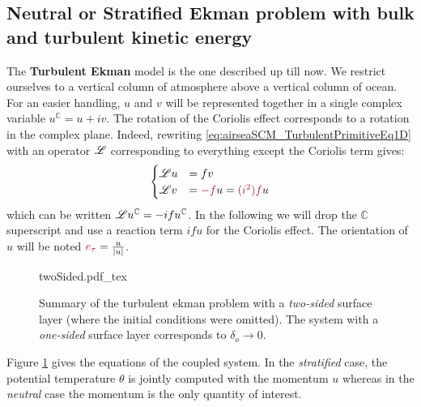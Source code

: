 \subsection{Neutral or Stratified Ekman problem with bulk and turbulent kinetic energy}
\label{sec:airseaSCM_hierarchy_TurbulentEkman}
The \textbf{Turbulent Ekman} model is the one described up till now.
We restrict ourselves to a vertical column of atmosphere
above a vertical column of ocean.
For an easier handling, $u$ and $v$ will be represented together in
a single complex variable $u^{\mathbb{C}} = u+iv$.
The rotation of the Coriolis effect corresponds to
a rotation in the complex plane.
Indeed, rewriting \eqref{eq:airseaSCM_TurbulentPrimitiveEq1D}
with an operator ${\cal L}$ corresponding to everything except
the Coriolis term gives:
\begin{equation}
	\label{eq:airseaSCM_complexForm}
\begin{cases}
	{\cal L}u &= fv\\
	{\cal L}v &= \emphase{- f}u = \emphase{(i^2) f} u
\end{cases}
\end{equation}
which can be written ${\cal L}u^{\mathbb{C}} = -i f u^\mathbb{C}$.
In the following we will drop the ${\mathbb{C}}$ superscript
and use a reaction term $ifu$ for the Coriolis effect. The
orientation of $u$ will be noted $\emphase{e_\tau} = \frac{u}{|u|}$.
\begin{figure}
	\centering
	{twoSided.pdf_tex}
	\caption{Summary
	of the turbulent ekman problem with a
	\textit{two-sided} surface layer (where
	the initial conditions were omitted). The 
	system with a \textit{one-sided} surface layer corresponds
	to $\delta_o \rightarrow 0$.
	}
	\label{fig:airseaSCM_twoSidedBulk_drawing}
\end{figure}
Figure \ref{fig:airseaSCM_twoSidedBulk_drawing} gives
the equations of the coupled system. In the \textit{stratified}
case, the potential temperature $\theta$ is jointly computed with the
momentum $u$ whereas in the \textit{neutral} case the momentum
is the only quantity of interest.
